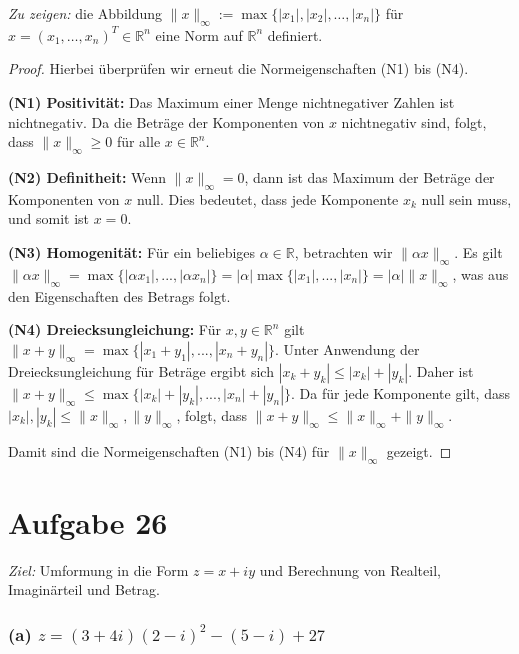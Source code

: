 \documentclass{article}
\theoremstyle{definition}
\theoremstyle{remark}
\begin{document}
\textit{Zu zeigen:} die Abbildung \( \| x \|_{\infty} := \max \{ |x_1|, |x_2|, \ldots, |x_n| \} \) für \( x = (x_1, \ldots, x_n)^T \in \mathbb{R}^n \) eine Norm auf \( \mathbb{R}^n \) definiert.

\begin{proof} Hierbei überprüfen wir erneut die Normeigenschaften (N1) bis (N4).

    \textbf{(N1) Positivität:}
    Das Maximum einer Menge nichtnegativer Zahlen ist nichtnegativ. Da die Beträge der Komponenten von \( x \) nichtnegativ sind, folgt, dass \( \| x \|_{\infty} \geq 0 \) für alle \( x \in \mathbb{R}^n \).

    \textbf{(N2) Definitheit:}
    Wenn \( \| x \|_{\infty} = 0 \), dann ist das Maximum der Beträge der Komponenten von \( x \) null. Dies bedeutet, dass jede Komponente \( x_k \) null sein muss, und somit ist \( x = 0 \).

    \textbf{(N3) Homogenität:}
    Für ein beliebiges \( \alpha \in \mathbb{R} \), betrachten wir \( \| \alpha x \|_{\infty} \). Es gilt \( \| \alpha x \|_{\infty} = \max \{ |\alpha x_1|, ..., |\alpha x_n| \} = |\alpha| \max \{ |x_1|, ..., |x_n| \} = |\alpha| \| x \|_{\infty} \), was aus den Eigenschaften des Betrags folgt.

    \textbf{(N4) Dreiecksungleichung:}
    Für \( x, y \in \mathbb{R}^n \) gilt \( \| x + y \|_{\infty} = \max \{ |x_1 + y_1|, ..., |x_n + y_n| \} \). Unter Anwendung der Dreiecksungleichung für Beträge ergibt sich \( |x_k + y_k| \leq |x_k| + |y_k| \). Daher ist \( \| x + y \|_{\infty} \leq \max \{ |x_k| + |y_k|, ..., |x_n| + |y_n| \} \). Da für jede Komponente gilt, dass \( |x_k|, |y_k| \leq \| x \|_{\infty}, \| y \|_{\infty} \), folgt, dass \( \| x + y \|_{\infty} \leq \| x \|_{\infty} + \| y \|_{\infty} \).

    Damit sind die Normeigenschaften (N1) bis (N4) für \( \| x \|_{\infty} \) gezeigt.
\end{proof}


\section*{Aufgabe 26}

\textit{Ziel:} Umformung in die Form \( z = x + iy \) und Berechnung von Realteil, Imaginärteil und Betrag.

\subsubsection*{(a) \( z = (3 + 4i)(2 - i)^{2} - (5 - i) + 27\)}
\end{document}
